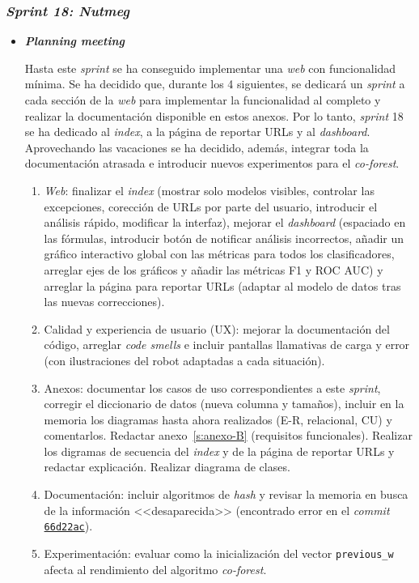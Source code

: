 \subsubsection{\textit{Sprint 18: Nutmeg}}
\begin{itemize}
	\item \textbf{\textit{Planning meeting}}
	
	Hasta este \textit{sprint} se ha conseguido implementar una \textit{web} con funcionalidad mínima. Se ha decidido que, durante los 4 siguientes, se dedicará un \textit{sprint} a cada sección de la \textit{web} para implementar la funcionalidad al completo y realizar la documentación disponible en estos anexos. Por lo tanto, \textit{sprint} 18 se ha dedicado al \textit{index}, a la página de reportar URLs y al \textit{dashboard}. Aprovechando las vacaciones se ha decidido, además, integrar toda la documentación atrasada e introducir nuevos experimentos para el \textit{co-forest}.
	
	\begin{enumerate}
		\item \textit{Web}: finalizar el \textit{index} (mostrar solo modelos visibles, controlar las excepciones, corección de URLs por parte del usuario, introducir el análisis rápido, modificar la interfaz), mejorar el \textit{dashboard} (espaciado en las fórmulas, introducir botón de notificar análisis incorrectos, añadir un gráfico interactivo global con las métricas para todos los clasificadores, arreglar ejes de los gráficos y añadir las métricas F1 y ROC AUC) y arreglar la página para reportar URLs (adaptar al modelo de datos tras las nuevas correcciones).
		\item Calidad y experiencia de usuario (UX): mejorar la documentación del código, arreglar \textit{code smells} e incluir pantallas llamativas de carga y error (con ilustraciones del robot adaptadas a cada situación).
		\item Anexos: documentar los casos de uso correspondientes a este \textit{sprint}, corregir el diccionario de datos (nueva columna y tamaños), incluir en la memoria los diagramas hasta ahora realizados (E-R, relacional, CU) y comentarlos. Redactar anexo~\ref{s:anexo-B} (requisitos funcionales). Realizar los digramas de secuencia del \textit{index} y de la página de reportar URLs y redactar explicación. Realizar diagrama de clases.
		\item Documentación: incluir algoritmos de \textit{hash} y revisar la memoria en busca de la información <<desaparecida>> (encontrado error en el \textit{commit} \href{https://github.com/phf1001/semisupervised-learning-in-cibersecurity/commit/66d22ac0cf9ffc24385656ae85bf831e03f924be}{\texttt{66d22ac}}).
		\item{Experimentación}: evaluar como la inicialización del vector \texttt{previous\_w} afecta al rendimiento del algoritmo \textit{co-forest}.
		

\end{enumerate}
\end{itemize}
